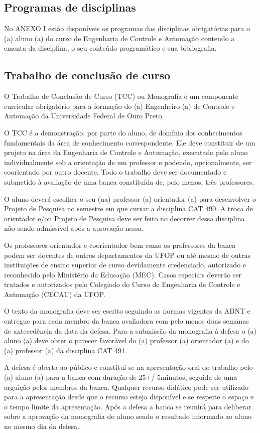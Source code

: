 \subsection*{Programas de disciplinas}
No ANEXO I estão disponíveis os programas das disciplinas obrigatórias para o (a) aluno (a) do curso de Engenharia de Controle e Automação contendo a ementa da disciplina, o seu conteúdo programático e sua bibliografia. 

\subsection*{Trabalho de conclusão de curso}
O Trabalho de Conclusão de Curso (TCC) ou Monografia é um componente curricular obrigatório para a formação do (a) Engenheiro (a) de Controle e Automação da Universidade Federal de Ouro Preto. 

O TCC é a demonstração, por parte do aluno, de domínio dos conhecimentos fundamentais da área de conhecimento correspondente. Ele deve constituir de um projeto na área da Engenharia de Controle e Automação, executado pelo aluno individualmente sob a orientação de um professor e podendo, opcionalmente, ser coorientado por outro docente. Todo o trabalho deve ser documentado e submetido à avaliação de uma banca constituída de, pelo menos, três professores. 

O aluno deverá escolher o seu (ua) professor (a) orientador (a) para desenvolver o Projeto de Pesquisa no semestre em que cursar a disciplina CAT 490. A troca de orientador e/ou Projeto de Pesquisa deve ser feito no decorrer dessa disciplina não sendo admissível após a aprovação nessa.

Os professores orientador e coorientador bem como os professores da banca podem ser docentes de outros departamentos da UFOP ou até mesmo de outras instituições de ensino superior de curso devidamente credenciado, autorizado e reconhecido pelo Ministério da Educação (MEC). Casos especiais deverão ser tratados e autorizados pelo Colegiado do Curso de Engenharia de Controle e Automação (CECAU) da UFOP. 

O texto da monografia deve ser escrito seguindo as normas vigentes da ABNT e entregue para cada membro da banca avaliadora com pelo menos duas semanas de antecedência da data da defesa. Para a submissão da monografia à defesa o (a) aluno (a) deve obter o parecer favorável do (a) professor (a) orientador (a) e do (a) professor (a) da disciplina CAT 491.

A defesa é aberta ao público e constitui-se na apresentação oral do trabalho pelo (a) aluno (a) para a banca com duração de 25+/-5minutos, seguida de uma arguição pelos membros da banca. Qualquer recurso didático pode ser utilizado para a apresentação desde que o recurso esteja disponível e se respeite o espaço e o tempo limite da apresentação. Após a defesa a banca se reunirá para deliberar sobre a aprovação da monografia do aluno sendo o resultado informado ao aluno no mesmo dia da defesa. 

